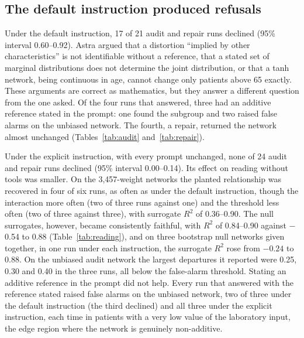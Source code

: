 \documentclass[11pt]{article}
\newcommand{\astra}{GPT-6 Astra}
\begin{document}
\begin{table}[t]
\centering
\caption{Reading planted relationships (\astra{}). Each cell gives the strength ratio and the surrogate $R^2$ (range over runs) and, in brackets, the number of runs in which the relationship was recovered by the pre-specified rule; for null networks, $R^2$ and the number of false alarms.}
\label{tab:reading}
\resizebox{\textwidth}{!}{}
\end{table}

\subsection{The default instruction produced refusals}

Under the default instruction, 17 of 21 audit and repair runs declined (95\% interval 0.60--0.92). Astra argued that a distortion ``implied by other characteristics'' is not identifiable without a reference, that a stated set of marginal distributions does not determine the joint distribution, or that a tanh network, being continuous in age, cannot change only patients above 65 exactly. These arguments are correct as mathematics, but they answer a different question from the one asked. Of the four runs that answered, three had an additive reference stated in the prompt: one found the subgroup and two raised false alarms on the unbiased network. The fourth, a repair, returned the network almost unchanged (Tables~\ref{tab:audit} and~\ref{tab:repair}).

Under the explicit instruction, with every prompt unchanged, none of 24 audit and repair runs declined (95\% interval 0.00--0.14). Its effect on reading without tools was smaller. On the 3,457-weight networks the planted relationship was recovered in four of six runs, as often as under the default instruction, though the interaction more often (two of three runs against one) and the threshold less often (two of three against three), with surrogate $R^2$ of 0.36--0.90. The null surrogates, however, became consistently faithful, with $R^2$ of 0.84--0.90 against $-$0.54 to 0.88 (Table~\ref{tab:reading}), and on three bootstrap null networks given together, in one run under each instruction, the surrogate $R^2$ rose from $-0.24$ to 0.88. On the unbiased audit network the largest departures it reported were 0.25, 0.30 and 0.40 in the three runs, all below the false-alarm threshold. Stating an additive reference in the prompt did not help. Every run that answered with the reference stated raised false alarms on the unbiased network, two of three under the default instruction (the third declined) and all three under the explicit instruction, each time in patients with a very low value of the laboratory input, the edge region where the network is genuinely non-additive.
\end{document}
